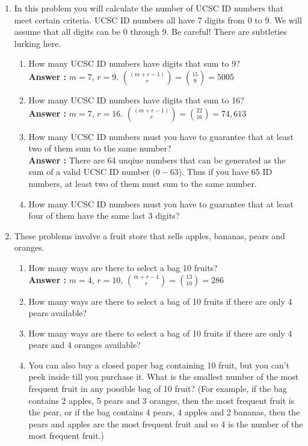 \documentclass[a4paper,10pt]{article}
\newcommand{\answer}{\textbf{Answer : }}
\begin{document}
\begin{enumerate}
\item In this problem you will calculate the number of UCSC ID numbers that meet certain criteria. UCSC ID numbers all have 7 digits from 0 to 9. We will assume that all digits can be 0 through 9. Be careful! There are subtleties lurking here.

    \begin{enumerate}
    \item How many UCSC ID numbers have digits that sum to 9? \\
    \answer $m = 7$, $r = 9$. ${(m+r-1) \choose r} = {15 \choose 9} = 5005$

    \item How many UCSC ID numbers have digits that sum to 16? \\
    \answer $m = 7$, $r = 16$. ${(m+r-1) \choose r} = {22 \choose 16} = 74,613$

    \item How many UCSC ID numbers must you have to guarantee that at least two of them sum to the same number? \\
    \answer There are 64 unqiue numbers that can be generated as the sum of a valid UCSC ID number ($0-63$). Thus if you have 65 ID numbers, at least two of them must sum to the same number.

    \item How many UCSC ID numbers must you have to guarantee that at least four of them have the same last 3 digits?
    \end{enumerate}


\item These problems involve a fruit store that sells apples, bananas, pears and oranges.
    \begin{enumerate}
    \item How many ways are there to select a bag 10 fruits? \\
    \answer $m = 4$, $r = 10$, ${m+r-1 \choose r} = {13 \choose 10} = 286$
    \item How many ways are there to select a bag of 10 fruits if there are only 4 pears available?
    \item How many ways are there to select a bag of 10 fruits if there are only 4 pears and 4 oranges available?
    \item You can also buy a closed paper bag containing 10 fruit, but you can’t peek inside till you purchase it. What is the smallest number of the most frequent fruit in any possible bag of 10 fruit? (For example, if the bag contains 2 apples, 5 pears and 3 oranges, then the most frequent fruit is the pear, or if the bag contains 4 pears, 4 apples and 2 bananas, then the pears and apples are the most frequent fruit and so 4 is the number of the most frequent fruit.)
    \end{enumerate}

\end{enumerate}
\end{document}
